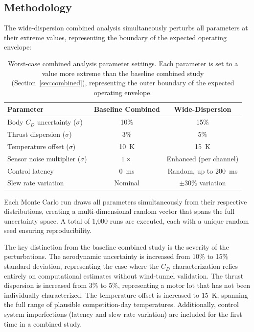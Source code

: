 \documentclass[11pt,letterpaper]{article}
\newcommand{\Cd}{C_D}
\begin{document}
\subsection{Methodology}
\label{sec:worstcase_method}

The wide-dispersion combined analysis simultaneously perturbs all parameters at their extreme values, representing the boundary of the expected operating envelope:

\begin{table}[H]
    \centering
    \caption{Worst-case combined analysis parameter settings. Each parameter is set to a value more extreme than the baseline combined study (Section~\ref{sec:combined}), representing the outer boundary of the expected operating envelope.}
    \label{tab:worstcase_params}
    \begin{tabular}{lcc}
        \toprule
        \textbf{Parameter} & \textbf{Baseline Combined} & \textbf{Wide-Dispersion} \\
        \midrule
        Body $\Cd$ uncertainty ($\sigma$) & 10\% & 15\% \\
        Thrust dispersion ($\sigma$) & 3\% & 5\% \\
        Temperature offset ($\sigma$) & \SI{10}{\kelvin} & \SI{15}{\kelvin} \\
        Sensor noise multiplier ($\sigma$) & $1\times$ & Enhanced (per channel) \\
        Control latency & \SI{0}{\milli\second} & Random, up to \SI{200}{\milli\second} \\
        Slew rate variation & Nominal & $\pm 30\%$ variation \\
        \bottomrule
    \end{tabular}
\end{table}

Each Monte Carlo run draws all parameters simultaneously from their respective distributions, creating a multi-dimensional random vector that spans the full uncertainty space. A total of 1{,}000 runs are executed, each with a unique random seed ensuring reproducibility.

The key distinction from the baseline combined study is the severity of the perturbations. The aerodynamic uncertainty is increased from 10\% to 15\% standard deviation, representing the case where the $\Cd$ characterization relies entirely on computational estimates without wind-tunnel validation. The thrust dispersion is increased from 3\% to 5\%, representing a motor lot that has not been individually characterized. The temperature offset is increased to \SI{15}{\kelvin}, spanning the full range of plausible competition-day temperatures. Additionally, control system imperfections (latency and slew rate variation) are included for the first time in a combined study.
\end{document}

